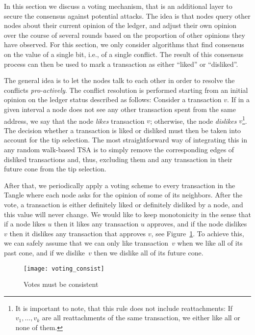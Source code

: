 \documentclass[../main.tex]{subfiles}
\begin{document}
In this section we discuss a voting mechanism, that is an additional layer to secure the consensus against potential attacks. The idea is that nodes query other nodes about their current opinion of the ledger, and adjust their own opinion over the course of several rounds based on the proportion of other opinions they have observed. For this section, we only consider algorithms that find consensus on the value of a single bit, i.e., of a single conflict. The result of this consensus process can then be used to mark a transaction as either \enquote{liked} or \enquote{disliked}.

The general idea is to let the nodes talk to each other in order to resolve the conflicts \textit{pro-actively}. The conflict resolution is performed starting from an initial opinion on the ledger status described as follows:
Consider a transaction $v$. If in a given interval a node does not see any other transaction spent from the same address, we say that the node \textit{likes} transaction $v$; otherwise, the node \textit{dislikes} $v$\footnote{It is important to note, that this rule does not include reattachments: If $v_1,\ldots ,v_k$ are all reattachments of the same transaction, we either like all or none of them.}.
The decision whether a transaction is liked or disliked must then be taken into account for the tip selection.
The most straightforward way of integrating this in any random walk-based TSA is to simply remove the corresponding edges of disliked transactions and, thus, excluding them and any transaction in their future cone from the tip selection.

After that, we periodically apply a voting scheme to every transaction in the Tangle where each node asks for the opinion of some of its neighbors. After the vote, a transaction is either definitely liked or definitely disliked by a node, and this value will never change.
We would like to keep monotonicity in the sense that if a node likes $u$ then it likes any transaction $u$ approves, and if the node dislikes $v$ then it dislikes any transaction that approves $v$, see Figure~\ref{f_voting_consist}.
To achieve this, we can safely assume that we can only like transaction~$v$ when we like all of its past cone, and if we dislike~$v$ then we dislike all of its future cone.

\begin{figure}
\begin{center}
\texttt{[image: voting\_consist]}
\caption{Votes must be consistent}
\label{f_voting_consist}
\end{center}
\end{figure}
\end{document}
